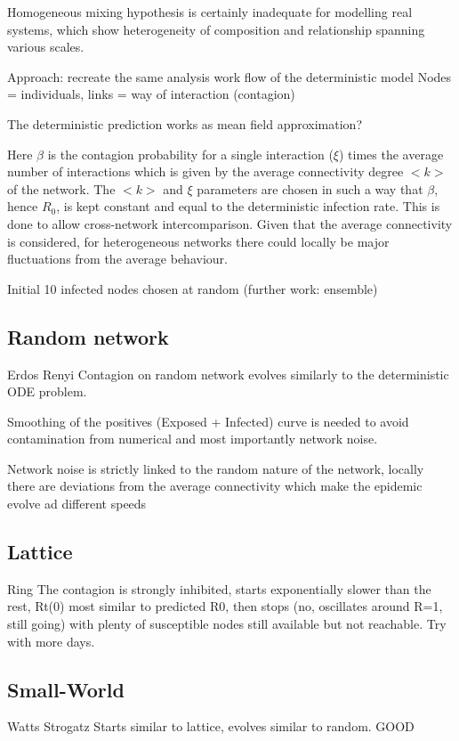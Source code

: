 \documentclass[DIV=12, BCOR=0pt]{scrartcl}  %
\begin{document}
  Homogeneous mixing hypothesis is certainly inadequate for modelling real systems, which show heterogeneity of composition and relationship spanning various scales. 
  
  
  
  
  Approach: recreate the same analysis work flow of the deterministic model
  Nodes = individuals, links = way of interaction (contagion)
  
  The deterministic prediction works as mean field approximation?
  
  Here $\beta$ is the contagion probability for a single interaction ($\xi$) times the average number of interactions which is given by the average connectivity degree $<k>$ of the network. The $<k>$ and $\xi$ parameters are chosen in such a way that $\beta$, hence $R_0$, is kept constant and equal to the deterministic infection rate. This is done to allow cross-network intercomparison. Given that the average connectivity is considered, for heterogeneous networks there could locally be major fluctuations from the average behaviour.
  
  
  Initial 10 infected nodes chosen at random (further work: ensemble)
  
  \subsection{Random network}
  Erdos Renyi
  Contagion on random network evolves similarly to the deterministic ODE problem. 
  
  Smoothing of the positives (Exposed + Infected) curve is needed to avoid contamination from numerical and most importantly network noise. 
  
  Network noise is strictly linked to the random nature of the network, locally there are deviations from the average connectivity which make the epidemic evolve ad different speeds
  
  
  \subsection{Lattice}
  Ring
  The contagion is strongly inhibited, starts exponentially slower than the rest, Rt(0) most similar to predicted R0,
  then stops (no, oscillates around R=1, still going) with plenty of susceptible nodes still available but not reachable. Try with more days.
  
  
  \subsection{Small-World}
  Watts Strogatz
  Starts similar to lattice, evolves similar to random. GOOD
  
\end{document}
